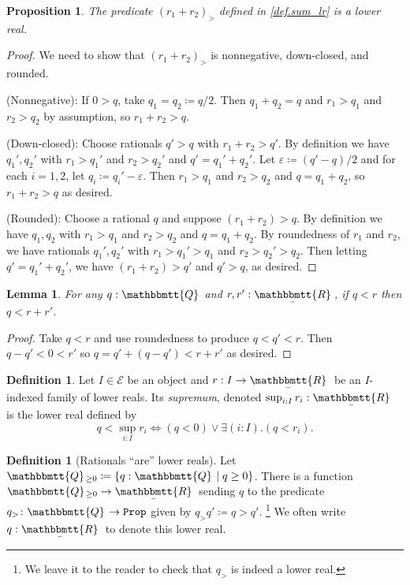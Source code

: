\documentclass[11pt, oneside, article]{memoir}
\theoremstyle{plain}
\newtheorem{proposition}[theorem]{Proposition}
\newtheorem{lemma}[theorem]{Lemma}
\theoremstyle{definition}
\newtheorem{definition}[theorem]{Definition}
\theoremstyle{remark}
\newcommand{\const}[1]{\mathtt{#1}}
\newcommand{\cat}[1]{\mathcal{#1}}
\newcommand{\ubar}[1]{\underaccent{\bar}{#1}}
\newcommand{\internal}[1]{\raisebox{-.03ex}{$\mathbbmtt{#1}$}}
\newcommand{\hs}{\hspace{1.1pt}}
\newcommand{\tqq}{\internal{Q}\hs}
\newcommand{\trr}{\internal{R}\hs}
\newcommand{\tlrr}{\ubar{\trr}\hs}
\newcommand{\prop}{\const{Prop}}
\renewcommand{\iff}{\Leftrightarrow}
\begin{document}
\begin{proposition}\label{prop.sum_lr}
The predicate $(r_1+r_2)_>$ defined in \cref{def.sum_lr} is a lower real.
\end{proposition}
\begin{proof}
We need to show that $(r_1+r_2)_>$ is nonnegative, down-closed, and rounded.

\noindent (Nonnegative): If $0>q$, take $q_1=q_2\coloneqq q/2$. Then $q_1+q_2=q$ and $r_1>q_1$ and $r_2>q_2$ by assumption, so $r_1+r_2>q$.

\noindent(Down-closed): Choose rationals $q'>q$ with $r_1+r_2>q'$. By definition we have $q_1',q_2'$ with $r_1>q_1'$ and $r_2>q_2'$ and $q'=q_1'+q_2'$. Let $\varepsilon\coloneqq (q'-q)/2$ and for each $i=1,2$, let $q_i\coloneqq q_i'-\varepsilon$. Then $r_1>q_1$ and $r_2>q_2$ and $q=q_1+q_2$, so $r_1+r_2>q$ as desired.

\noindent(Rounded): Choose a rational $q$ and suppose $(r_1+r_2)>q$. By definition we have $q_1,q_2$ with $r_1>q_1$ and $r_2>q_2$ and $q=q_1+q_2$. By roundedness of $r_1$ and $r_2$, we have rationals $q_1',q_2'$ with $r_1>q_1'>q_1$ and $r_2>q_2'>q_2$. Then letting $q'=q_1'+q_2'$, we have $(r_1+r_2)>q'$ and $q'>q$, as desired.
\end{proof}

\begin{lemma}\label{lemma.sums_bigger}
For any $q:\tqq$ and $r,r':\tlrr$, if $q<r$ then $q<r+r'$.
\end{lemma}
\begin{proof}
Take $q<r$ and use roundedness to produce $q<q'<r$. Then $q-q'<0<r'$ so $q=q'+(q-q')<r+r'$ as desired.
\end{proof}

\begin{definition}\label{def.sup}
Let $I\in\cat{E}$ be an object and $r:I\to\tlrr$ be an $I$-indexed family of lower reals. Its \emph{supremum}, denoted $\sup_{i:I}r_i:\tlrr$ is the lower real defined  by 
\[q<\sup_{i:I}r_i\iff (q<0)\vee\exists(i:I).(q<r_i).\]
\end{definition}


\begin{definition}[Rationals ``are'' lower reals]\label{def.rationals_are_reals}
Let $\tqq_{\geq0}\coloneqq\{q:\tqq\mid q\geq0\}$. There is a function $\tqq_{\geq0}\to\tlrr$ sending $q$ to the predicate $q_>\colon\tqq\to\prop$ given by $q_>q'\coloneqq q>q'$.%
\footnote{We leave it to the reader to check that $q_>$ is indeed a lower real.}
 We often write $q:\tlrr$ to denote this lower real.
\end{definition}
\end{document}

